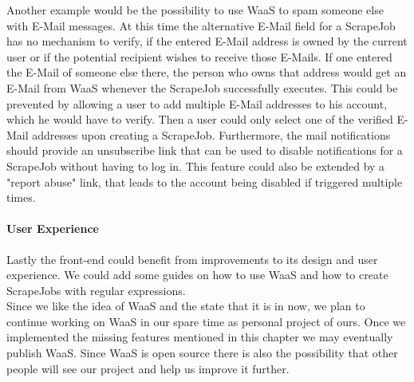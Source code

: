 \documentclass[titlepage, 12pt]{article}
\begin{document}
Another example would be the possibility to use WaaS to spam someone else with E-Mail messages. At this time the alternative E-Mail field for a ScrapeJob has no mechanism to verify, if the entered E-Mail address is owned by the current user or if the potential recipient wishes to receive those E-Mails. If one entered the E-Mail of someone else there, the person who owns that address would get an E-Mail from WaaS whenever the ScrapeJob successfully executes. This could be prevented by allowing a user to add multiple E-Mail addresses to his account, which he would have to verify. Then a user could only select one of the verified E-Mail addresses upon creating a ScrapeJob. Furthermore, the mail notifications should provide an unsubscribe link that can be used to disable notifications for a ScrapeJob without having to log in. This feature could also be extended by a "report abuse" link, that leads to the account being disabled if triggered multiple times.

\paragraph{User Experience}
Lastly the front-end could benefit from improvements to its design and user experience. We could add some guides on how to use WaaS and how to create ScrapeJobs with regular expressions.\\
Since we like the idea of WaaS and the state that it is in now, we plan to continue working on WaaS in our spare time as personal project of ours. Once we implemented the missing features mentioned in this chapter we may eventually publish WaaS. Since WaaS is open source there is also the possibility that other people will see our project and help us improve it further.

\pagebreak

\listoftables
\listoffigures

\pagebreak



\end{document}
